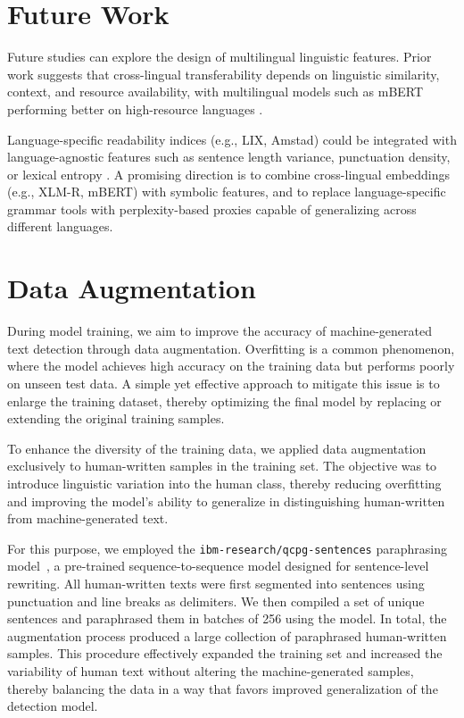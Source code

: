 \documentclass[11pt]{article}
\begin{document}
\section{Future Work}

Future studies can explore the design of multilingual linguistic features. Prior work suggests that cross-lingual transferability depends on linguistic similarity, context, and resource availability, with multilingual models such as mBERT performing better on high-resource languages \cite{ho2023transferability}.

Language-specific readability indices (e.g., LIX, Amstad) could be integrated with language-agnostic features such as sentence length variance, punctuation density, or lexical entropy \cite{peters2009clef}. A promising direction is to combine cross-lingual embeddings (e.g., XLM-R, mBERT) with symbolic features, and to replace language-specific grammar tools with perplexity-based proxies capable of generalizing across different languages.



\appendix
\section{Data Augmentation}
During model training, we aim to improve the accuracy of machine-generated text detection through data augmentation. Overfitting is a common phenomenon, where the model achieves high accuracy on the training data but performs poorly on unseen test data. A simple yet effective approach to mitigate this issue is to enlarge the training dataset, thereby optimizing the final model by replacing or extending the original training samples.

To enhance the diversity of the training data, we applied data augmentation exclusively to human-written samples in the training set. The objective was to introduce linguistic variation into the human class, thereby reducing overfitting and improving the model’s ability to generalize in distinguishing human-written from machine-generated text.

For this purpose, we employed the \texttt{ibm-research/qcpg-sentences} paraphrasing model~\cite{bandel2022qcpg}, a pre-trained sequence-to-sequence model designed for sentence-level rewriting. All human-written texts were first segmented into sentences using punctuation and line breaks as delimiters. We then compiled a set of unique sentences and paraphrased them in batches of 256 using the model. In total, the augmentation process produced a large collection of paraphrased human-written samples. This procedure effectively expanded the training set and increased the variability of human text without altering the machine-generated samples, thereby balancing the data in a way that favors improved generalization of the detection model.
\end{document}
